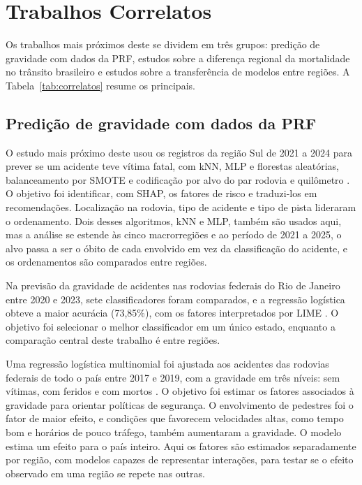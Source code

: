 \documentclass[12pt]{article}
\begin{document}
\section{Trabalhos Correlatos}

Os trabalhos mais próximos deste se dividem em três grupos: predição de
gravidade com dados da PRF, estudos sobre a diferença regional da
mortalidade no trânsito brasileiro e estudos sobre a transferência de
modelos entre regiões. A Tabela~\ref{tab:correlatos} resume os
principais.

\subsection{Predição de gravidade com dados da PRF}

O estudo mais próximo deste usou os registros da região Sul de 2021 a
2024 para prever se um acidente teve vítima fatal, com kNN, MLP e
florestas aleatórias, balanceamento por SMOTE \cite{chawla2002} e
codificação por alvo do par rodovia e quilômetro \cite{gabardo2025}. O
objetivo foi identificar, com SHAP, os fatores de risco e traduzi-los em
recomendações. Localização na rodovia, tipo de acidente e tipo de pista
lideraram o ordenamento. Dois desses algoritmos, kNN e MLP, também são usados aqui,
mas a análise se estende às cinco macrorregiões e ao período de 2021 a
2025, o alvo passa a ser o óbito de cada envolvido em vez da
classificação do acidente, e os ordenamentos são comparados entre
regiões.

Na previsão da gravidade de acidentes nas rodovias federais do Rio de
Janeiro entre 2020 e 2023, sete classificadores foram comparados, e a
regressão logística obteve a maior acurácia (73,85\%), com os fatores
interpretados por LIME \cite{mafort2025}. O objetivo foi selecionar o
melhor classificador em um único estado, enquanto a comparação central
deste trabalho é entre regiões.

Uma regressão logística multinomial foi ajustada aos acidentes das
rodovias federais de todo o país entre 2017 e 2019, com a gravidade em
três níveis: sem vítimas, com feridos e com mortos
\cite{franceschi2022}. O objetivo foi estimar os fatores associados à
gravidade para orientar políticas de segurança. O envolvimento de
pedestres foi o fator de maior efeito, e condições que favorecem
velocidades altas, como tempo bom e horários de pouco tráfego, também
aumentaram a gravidade. O modelo estima um efeito para o país inteiro.
Aqui os fatores são estimados separadamente por região, com modelos
capazes de representar interações, para testar se o efeito observado em
uma região se repete nas outras.
\end{document}
